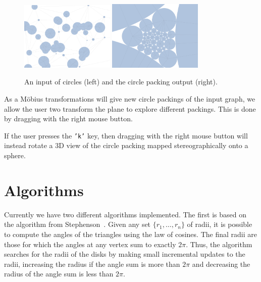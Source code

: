 \documentclass[a4paper,UKenglish]{lipics}
\begin{document}
  \begin{figure}[ht]
    \centering
      \includegraphics[width = 0.40\textwidth]{figures/input.png}
      \includegraphics[width = 0.40\textwidth]{figures/output.png}
    \caption{An input of circles (left) and the circle packing output (right).}
    \label{fig:input_output}
  \end{figure}
  
  As a M\"{o}bius transformations will give new circle packings of the input graph, we allow the user two transform the plane to explore different packings.
  This is done by dragging with the right mouse button.
  
  If the user presses the \texttt{'k'} key, then dragging with the right mouse button will instead rotate a 3D view of the circle packing mapped stereographically onto a sphere.
  

\section{Algorithms} %
\label{sec:algorithms}

  Currently we have two different algorithms implemented.
  The first is based on the algorithm from Stephenson~\cite{stephenson05introduction}.
  Given any set $\{r_1,\ldots, r_n\}$ of radii, it is possible to compute the angles of the triangles using the law of cosines.
  The final radii are those for which the angles at any vertex sum to exactly $2\pi$.
  Thus, the algorithm searches for the radii of the disks by making small incremental updates to the radii, increasing the radius if the angle sum is more than $2\pi$ and decreasing the radius of the angle sum is less than $2\pi$.
  
\end{document}
